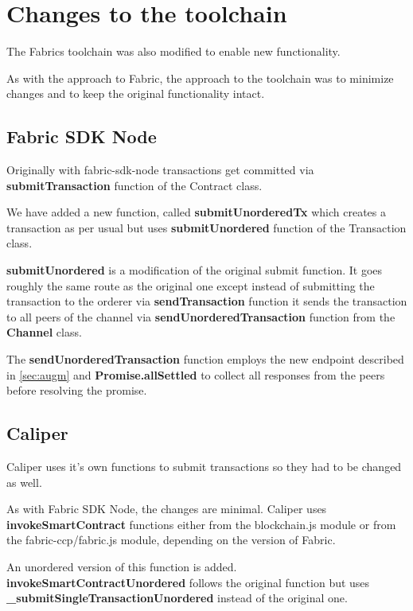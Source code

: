 \chapter{Changes to the toolchain}\label{chapter:sdks}

The Fabrics toolchain was also modified to enable new functionality.

As with the approach to Fabric, the approach to the toolchain was to minimize changes and to keep the original functionality intact.

\section{Fabric SDK Node}\label{chapter:sdk}

Originally with fabric-sdk-node transactions get committed via \textbf{submitTransaction} function of the Contract class.

We have added a new function, called \textbf{submitUnorderedTx} which creates a transaction as per usual but uses \textbf{submitUnordered} function of the Transaction class.

\textbf{submitUnordered} is a modification of the original submit function.
It goes roughly the same route as the original one except instead of submitting the transaction to the orderer via \textbf{sendTransaction} function it sends the transaction to all peers of the channel via \textbf{sendUnorderedTransaction} function from the \textbf{Channel} class.

The \textbf{sendUnorderedTransaction} function employs the new endpoint described in \ref{sec:augm} and \textbf{Promise.allSettled} to collect all responses from the peers before resolving the promise.

\section{Caliper}\label{chapter:caliper}

Caliper uses it's own functions to submit transactions so they had to be changed as well.

As with Fabric SDK Node, the changes are minimal. Caliper uses \textbf{invokeSmartContract} functions either from the blockchain.js module or from the fabric-ccp/fabric.js module, depending on the version of Fabric.

An unordered version of this function is added. \textbf{invokeSmartContractUnordered} follows the original function but uses \textbf{\_submitSingleTransactionUnordered} instead of the original one.

